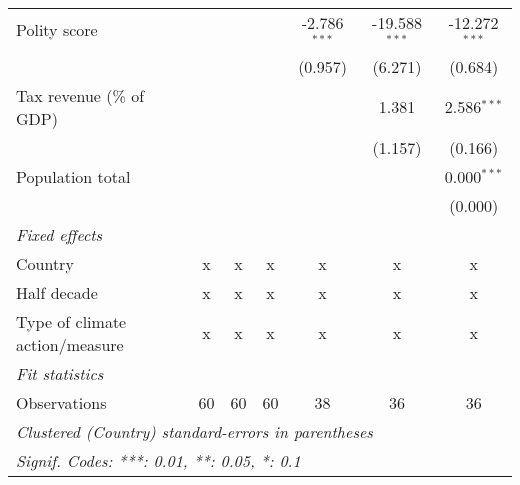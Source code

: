 \begin{tabular}{lcccccc}
   Polity score                                                      &         &             &         & -2.786$^{***}$ & -19.588$^{***}$ & -12.272$^{***}$\\   
                                                                     &         &             &         & (0.957)        & (6.271)         & (0.684)\\   
   Tax revenue (\% of GDP)                                           &         &             &         &                & 1.381           & 2.586$^{***}$\\   
                                                                     &         &             &         &                & (1.157)         & (0.166)\\   
   Population total                                                  &         &             &         &                &                 & 0.000$^{***}$\\   
                                                                     &         &             &         &                &                 & (0.000)\\   
   \emph{Fixed effects}\\
   Country                                                           & x       & x           & x       & x              & x               & x\\  
   Half decade                                                       & x       & x           & x       & x              & x               & x\\  
   Type of climate action/measure                                    & x       & x           & x       & x              & x               & x\\  
   \midrule \emph{Fit statistics}\\
   Observations                                                      & 60      & 60          & 60      & 38             & 36              & 36\\  
   \midrule
   \multicolumn{7}{l}{\emph{Clustered (Country) standard-errors in parentheses}}\\
   \multicolumn{7}{l}{\emph{Signif. Codes: ***: 0.01, **: 0.05, *: 0.1}}\\
\end{tabular}
\par\endgroup


